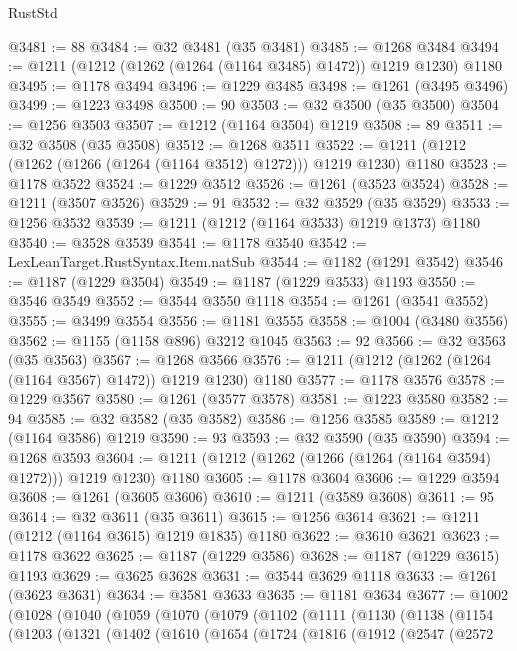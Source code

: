\begin{lexlean}{RustStd}
\begin{coremodule}
@3481 := 88
@3484 := @32 @3481 (@35 @3481)
@3485 := @1268 @3484
@3494 := @1211 (@1212 (@1262 (@1264 (@1164 @3485) @1472)) @1219 @1230) @1180
@3495 := @1178 @3494
@3496 := @1229 @3485
@3498 := @1261 (@3495 @3496)
@3499 := @1223 @3498
@3500 := 90
@3503 := @32 @3500 (@35 @3500)
@3504 := @1256 @3503
@3507 := @1212 (@1164 @3504) @1219
@3508 := 89
@3511 := @32 @3508 (@35 @3508)
@3512 := @1268 @3511
@3522 := @1211 (@1212 (@1262 (@1266 (@1264 (@1164 @3512) @1272))) @1219 @1230) @1180
@3523 := @1178 @3522
@3524 := @1229 @3512
@3526 := @1261 (@3523 @3524)
@3528 := @1211 (@3507 @3526)
@3529 := 91
@3532 := @32 @3529 (@35 @3529)
@3533 := @1256 @3532
@3539 := @1211 (@1212 (@1164 @3533) @1219 @1373) @1180
@3540 := @3528 @3539
@3541 := @1178 @3540
@3542 := LexLeanTarget.RustSyntax.Item.natSub
@3544 := @1182 (@1291 @3542)
@3546 := @1187 (@1229 @3504)
@3549 := @1187 (@1229 @3533) @1193
@3550 := @3546 @3549
@3552 := @3544 @3550 @1118
@3554 := @1261 (@3541 @3552)
@3555 := @3499 @3554
@3556 := @1181 @3555
@3558 := @1004 (@3480 @3556)
@3562 := @1155 (@1158 @896) @3212 @1045
@3563 := 92
@3566 := @32 @3563 (@35 @3563)
@3567 := @1268 @3566
@3576 := @1211 (@1212 (@1262 (@1264 (@1164 @3567) @1472)) @1219 @1230) @1180
@3577 := @1178 @3576
@3578 := @1229 @3567
@3580 := @1261 (@3577 @3578)
@3581 := @1223 @3580
@3582 := 94
@3585 := @32 @3582 (@35 @3582)
@3586 := @1256 @3585
@3589 := @1212 (@1164 @3586) @1219
@3590 := 93
@3593 := @32 @3590 (@35 @3590)
@3594 := @1268 @3593
@3604 := @1211 (@1212 (@1262 (@1266 (@1264 (@1164 @3594) @1272))) @1219 @1230) @1180
@3605 := @1178 @3604
@3606 := @1229 @3594
@3608 := @1261 (@3605 @3606)
@3610 := @1211 (@3589 @3608)
@3611 := 95
@3614 := @32 @3611 (@35 @3611)
@3615 := @1256 @3614
@3621 := @1211 (@1212 (@1164 @3615) @1219 @1835) @1180
@3622 := @3610 @3621
@3623 := @1178 @3622
@3625 := @1187 (@1229 @3586)
@3628 := @1187 (@1229 @3615) @1193
@3629 := @3625 @3628
@3631 := @3544 @3629 @1118
@3633 := @1261 (@3623 @3631)
@3634 := @3581 @3633
@3635 := @1181 @3634
@3677 := @1002
    (@1028
      (@1040
        (@1059
          (@1070
            (@1079
              (@1102
                (@1111
                  (@1130
                    (@1138
                      (@1154
                        (@1203
                          (@1321
                            (@1402
                              (@1610
                                (@1654
                                  (@1724
                                    (@1816
                                      (@1912
                                        (@2547
                                          (@2572

\end{coremodule}
\end{lexlean}
